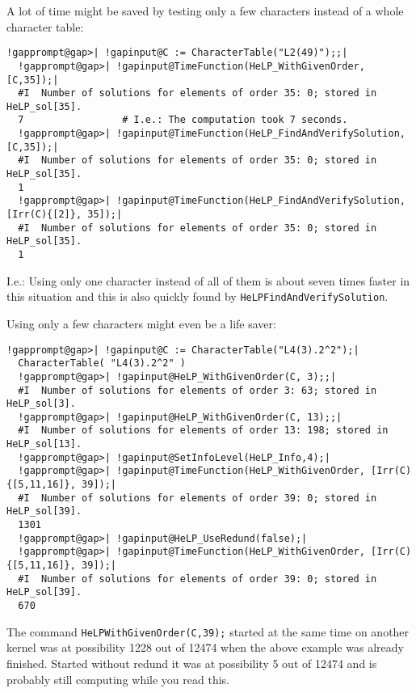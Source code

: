 \documentclass[a4paper,11pt]{report}
\begin{document}
{{ A lot of time might be saved by testing only a few characters instead of a
whole character table: 
\begin{Verbatim}[commandchars=!@|,fontsize=\small,frame=single,label=Example]
  !gapprompt@gap>| !gapinput@C := CharacterTable("L2(49)");;|
  !gapprompt@gap>| !gapinput@TimeFunction(HeLP_WithGivenOrder, [C,35]);|
  #I  Number of solutions for elements of order 35: 0; stored in HeLP_sol[35].
  7                 # I.e.: The computation took 7 seconds.
  !gapprompt@gap>| !gapinput@TimeFunction(HeLP_FindAndVerifySolution, [C,35]);|
  #I  Number of solutions for elements of order 35: 0; stored in HeLP_sol[35].
  1
  !gapprompt@gap>| !gapinput@TimeFunction(HeLP_FindAndVerifySolution, [Irr(C){[2]}, 35]);|
  #I  Number of solutions for elements of order 35: 0; stored in HeLP_sol[35].
  1
\end{Verbatim}
 I.e.: Using only one character instead of all of them is about seven times
faster in this situation and this is also quickly found by \texttt{HeLP{\textunderscore}FindAndVerifySolution}. 

 Using only a few characters might even be a life saver: 
\begin{Verbatim}[commandchars=!@|,fontsize=\small,frame=single,label=Example]
  !gapprompt@gap>| !gapinput@C := CharacterTable("L4(3).2^2");|
  CharacterTable( "L4(3).2^2" )
  !gapprompt@gap>| !gapinput@HeLP_WithGivenOrder(C, 3);;|
  #I  Number of solutions for elements of order 3: 63; stored in HeLP_sol[3].
  !gapprompt@gap>| !gapinput@HeLP_WithGivenOrder(C, 13);;|
  #I  Number of solutions for elements of order 13: 198; stored in HeLP_sol[13].
  !gapprompt@gap>| !gapinput@SetInfoLevel(HeLP_Info,4);|
  !gapprompt@gap>| !gapinput@TimeFunction(HeLP_WithGivenOrder, [Irr(C){[5,11,16]}, 39]);|
  #I  Number of solutions for elements of order 39: 0; stored in HeLP_sol[39].  
  1301
  !gapprompt@gap>| !gapinput@HeLP_UseRedund(false);|
  !gapprompt@gap>| !gapinput@TimeFunction(HeLP_WithGivenOrder, [Irr(C){[5,11,16]}, 39]);|
  #I  Number of solutions for elements of order 39: 0; stored in HeLP_sol[39].  
  670
\end{Verbatim}
 The command \texttt{HeLP{\textunderscore}WithGivenOrder(C,39);} started at the same time on another kernel was at possibility 1228 out of
12474 when the above example was already finished. Started without redund it
was at possibility 5 out of 12474 and is probably still computing while you
read this. 

}}
\end{document}
